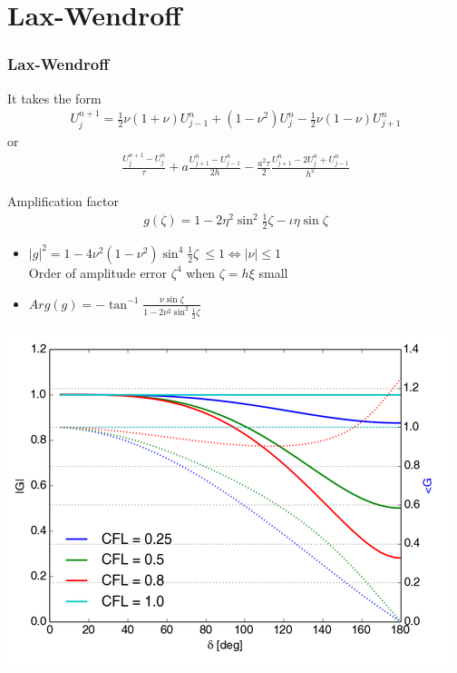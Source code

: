 \documentclass{beamer}
\begin{document}
\section{Lax-Wendroff}
\begin{frame}
\frametitle{Lax-Wendroff}
It takes the form
\begin{align*}
U_j^{n+1} = \frac{1}{2}\nu(1 + \nu)U_{j-1}^n + (1 - \nu^2)U_j^n - \frac{1}{2}\nu(1 - \nu)U_{j+1}^n
\end{align*}
or
\begin{align*}
\frac{U_j^{n+1} - U_j^n}{\tau} + a \frac{U_{j+1}^n -U_{j-1}^n}{2h} -\frac{a^2\tau}{2}\frac{U_{j+1}^n -2U_j^n+U_{j-1}^n}{h^2}
\end{align*}
\end{frame}
\begin{frame}
Amplification factor
\begin{align*}
g(\zeta) = 1 - 2 \eta^2\sin^2{\frac{1}{2}\zeta} - \iota \eta \sin{\zeta}
\end{align*}
\begin{itemize}
\setlength\itemsep{1em}
\item $|g|^2 = 1 - 4\nu^2(1-\nu^2)\sin^4{\frac{1}{2}\zeta} \ \leq 1 \iff |\nu| \leq 1$ \\ Order of amplitude error $\zeta^4$ when $\zeta = h\xi$ small
\item $Arg(g) = \displaystyle{-\tan^{-1}{\frac{\nu \sin{\zeta}}{1 - 2\nu^2\sin^2{\frac{1}{2}\zeta}}}}$
\end{itemize}
\end{frame}
\begin{frame}
\includegraphics[width=\textwidth]{lw_g}
\end{frame}
\end{document}
